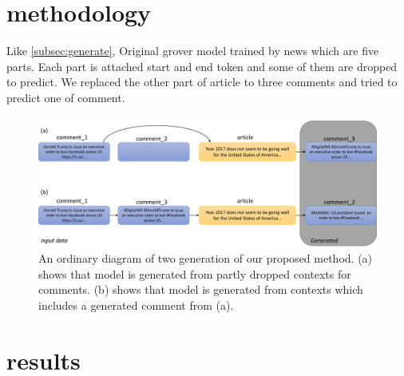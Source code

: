 \documentclass[conference]{IEEEtran}
\begin{document}
\section{methodology}
Like \ref{subsec:generate}, Original grover model trained by news which are five parts.
Each part is attached start and end token and some of them are dropped to predict.
We replaced the other part of article to three comments and tried to predict one of comment.
\begin{figure}[!t]
    \centering
    \includegraphics[width=\linewidth,pagebox=cropbox,clip]{fig_method.pdf}
    \caption{
        An ordinary diagram of two generation of our proposed method.
        (a) shows that model is generated from partly dropped contexts for comments.
        (b) shows that model is generated from contexts which includes a generated comment from (a).
    }
    \label{fig:method}
\end{figure}
\section{results}
\end{document}
